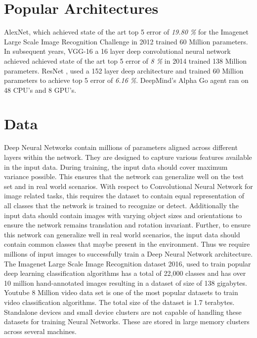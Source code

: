 \documentclass[sigconf]{acmart}
\begin{document}
\section{Popular Architectures}\label{art}

AlexNet\cite{NIPS2012-4824}, which achieved state of the art top 5 error of \textit{19.80 \%} for the Imagenet Large Scale Image Recognition Challenge in 2012 trained 60 Million parameters. In subsequent years, VGG-16 \cite{DBLP:journals/corr/SimonyanZ14a} a 16 layer deep convolutional neural network achieved achieved state of the art top 5 error of \textit{8 \%} in 2014 trained 138 Million parameters. ResNet \cite{DBLP:journals/corr/HeZRS15}, used a 152 layer deep architecture and trained 60 Million parameters to achieve top 5 error of \textit{6.16 \%}. DeepMind's Alpha Go agent ran on 48 CPU's and 8 GPU's. 

\section{Data} \label{size}

Deep Neural Networks contain millions of parameters aligned across different layers within the network. They are designed to capture various features available in the input data. During training, the input data should cover maximum variance possible. This ensures that the network can generalize well on the test set and in real world scenarios. With respect to Convolutional Neural Network for image related tasks, this requires the dataset to contain equal representation of all classes that the network is trained to recognize or detect. Additionally the input data should contain images with varying object sizes and orientations to ensure the network remains translation and rotation invariant. Further, to ensure this network can generalize well in real world scenarios, the input data should contain common classes that maybe present in the environment. Thus we require millions of input images to successfully train a Deep Neural Network architecture. The Imagenet Large Scale Image Recognition dataset 2016, used to train popular deep learning classification algorithms has a total of 22,000 classes and has over 10 million hand-annotated images resulting in a dataset of size of 138 gigabytes. Youtube 8 Million video data set is one of the most popular datasets to train video classification algorithms. The total size of the dataset is 1.7 terabytes. Standalone devices and small device clusters are not capable of handling these datasets for training Neural Networks. These are stored in large memory clusters across several machines. 
\end{document}
